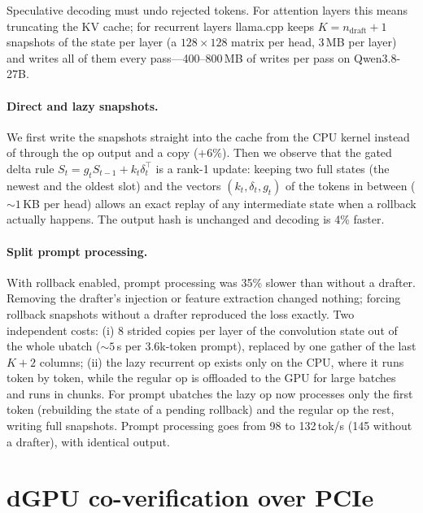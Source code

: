 \documentclass[10pt]{article}
\newcommand{\tps}{tok/s}
\begin{document}
Speculative decoding must undo rejected tokens. For attention layers this means truncating the KV cache; for
recurrent layers llama.cpp keeps $K=n_\text{draft}+1$ snapshots of the state per layer (a $128\times128$ matrix per
head, 3\,MB per layer) and writes all of them every pass---400--800\,MB of writes per pass on Qwen3.8-27B.

\paragraph{Direct and lazy snapshots.} We first write the snapshots straight into the cache from the CPU kernel instead
of through the op output and a copy ($+6\%$). Then we observe that the gated delta rule
$S_t = g_t S_{t-1} + k_t \delta_t^\top$ is a rank-1 update: keeping two full states (the newest and the oldest slot) and
the vectors $(k_t,\delta_t,g_t)$ of the tokens in between (${\sim}1$\,KB per head) allows an exact replay of any
intermediate state when a rollback actually happens. The output hash is unchanged and decoding is 4\% faster.

\paragraph{Split prompt processing.} With rollback enabled, prompt processing was 35\% slower than without a drafter.
Removing the drafter's injection or feature extraction changed nothing; forcing rollback snapshots without a drafter
reproduced the loss exactly. Two independent costs: (i) 8 strided copies per layer of the convolution state out of the
whole ubatch (${\sim}5$\,s per 3.6k-token prompt), replaced by one gather of the last $K+2$ columns; (ii) the lazy
recurrent op exists only on the CPU, where it runs token by token, while the regular op is offloaded to the GPU for
large batches and runs in chunks. For prompt ubatches the lazy op now processes only the first token (rebuilding the
state of a pending rollback) and the regular op the rest, writing full snapshots. Prompt processing goes from 98 to
132\,\tps{} (145 without a drafter), with identical output.

\section{dGPU co-verification over PCIe}\label{sec:dgpu}
\end{document}

